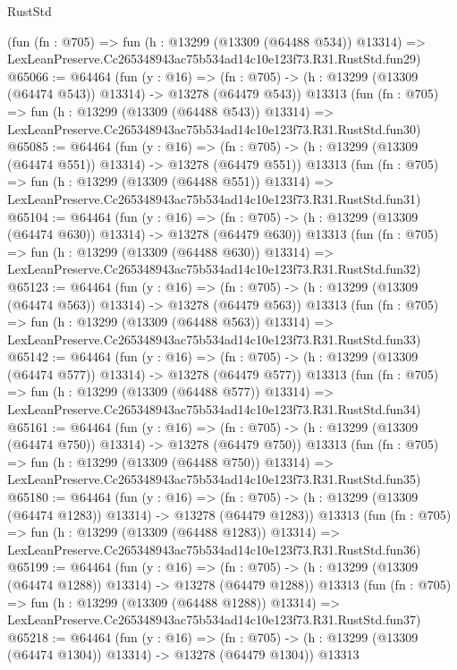 \begin{lexlean}{RustStd}
\begin{coremodule}
    (fun (fn : @705) =>
    fun (h : @13299 (@13309 (@64488 @534)) @13314) =>
    LexLeanPreserve.Cc265348943ac75b534ad14c10e123f73.R31.RustStd.fun29)
@65066 := @64464
    (fun (y : @16) =>
    (fn : @705) -> (h : @13299 (@13309 (@64474 @543)) @13314) -> @13278 (@64479 @543))
    @13313
    (fun (fn : @705) =>
    fun (h : @13299 (@13309 (@64488 @543)) @13314) =>
    LexLeanPreserve.Cc265348943ac75b534ad14c10e123f73.R31.RustStd.fun30)
@65085 := @64464
    (fun (y : @16) =>
    (fn : @705) -> (h : @13299 (@13309 (@64474 @551)) @13314) -> @13278 (@64479 @551))
    @13313
    (fun (fn : @705) =>
    fun (h : @13299 (@13309 (@64488 @551)) @13314) =>
    LexLeanPreserve.Cc265348943ac75b534ad14c10e123f73.R31.RustStd.fun31)
@65104 := @64464
    (fun (y : @16) =>
    (fn : @705) -> (h : @13299 (@13309 (@64474 @630)) @13314) -> @13278 (@64479 @630))
    @13313
    (fun (fn : @705) =>
    fun (h : @13299 (@13309 (@64488 @630)) @13314) =>
    LexLeanPreserve.Cc265348943ac75b534ad14c10e123f73.R31.RustStd.fun32)
@65123 := @64464
    (fun (y : @16) =>
    (fn : @705) -> (h : @13299 (@13309 (@64474 @563)) @13314) -> @13278 (@64479 @563))
    @13313
    (fun (fn : @705) =>
    fun (h : @13299 (@13309 (@64488 @563)) @13314) =>
    LexLeanPreserve.Cc265348943ac75b534ad14c10e123f73.R31.RustStd.fun33)
@65142 := @64464
    (fun (y : @16) =>
    (fn : @705) -> (h : @13299 (@13309 (@64474 @577)) @13314) -> @13278 (@64479 @577))
    @13313
    (fun (fn : @705) =>
    fun (h : @13299 (@13309 (@64488 @577)) @13314) =>
    LexLeanPreserve.Cc265348943ac75b534ad14c10e123f73.R31.RustStd.fun34)
@65161 := @64464
    (fun (y : @16) =>
    (fn : @705) -> (h : @13299 (@13309 (@64474 @750)) @13314) -> @13278 (@64479 @750))
    @13313
    (fun (fn : @705) =>
    fun (h : @13299 (@13309 (@64488 @750)) @13314) =>
    LexLeanPreserve.Cc265348943ac75b534ad14c10e123f73.R31.RustStd.fun35)
@65180 := @64464
    (fun (y : @16) =>
    (fn : @705) -> (h : @13299 (@13309 (@64474 @1283)) @13314) -> @13278 (@64479 @1283))
    @13313
    (fun (fn : @705) =>
    fun (h : @13299 (@13309 (@64488 @1283)) @13314) =>
    LexLeanPreserve.Cc265348943ac75b534ad14c10e123f73.R31.RustStd.fun36)
@65199 := @64464
    (fun (y : @16) =>
    (fn : @705) -> (h : @13299 (@13309 (@64474 @1288)) @13314) -> @13278 (@64479 @1288))
    @13313
    (fun (fn : @705) =>
    fun (h : @13299 (@13309 (@64488 @1288)) @13314) =>
    LexLeanPreserve.Cc265348943ac75b534ad14c10e123f73.R31.RustStd.fun37)
@65218 := @64464
    (fun (y : @16) =>
    (fn : @705) -> (h : @13299 (@13309 (@64474 @1304)) @13314) -> @13278 (@64479 @1304))
    @13313

\end{coremodule}
\end{lexlean}
